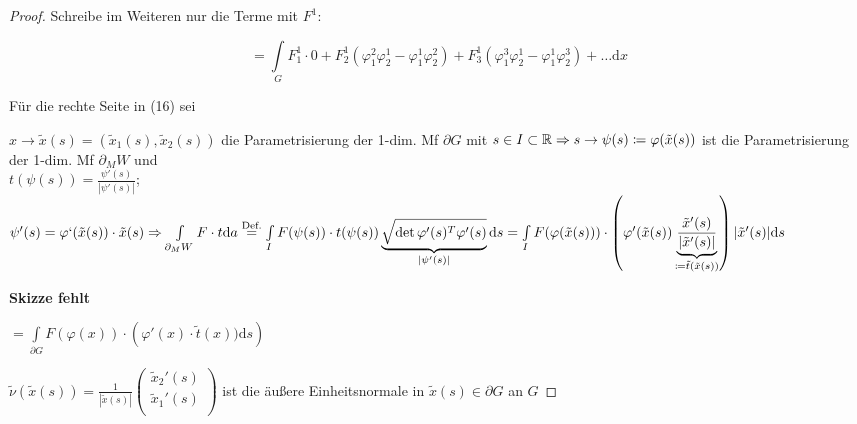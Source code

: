 \begin{proof}
Schreibe im Weiteren nur die Terme mit $F^1$:

\begin{equation*}
    =
    \int\limits_G F_1^1 \cdot 0
    +
    F_2^1 (\varphi_1^2 \varphi_2^1 - \varphi_1^1 \varphi_2^2)
    +
    F_3^1 (\varphi_1^3 \varphi_2^1 - \varphi_1^1 \varphi_2^3)
    +
    \ldots \mathrm{d}x
    \tag{$\heartsuit$}
\end{equation*}

Für die rechte Seite in (16) sei

$x \rightarrow \tilde{x}(s) = (\tilde{x}_1 (s), \tilde{x}_2 (s)) $
die Parametrisierung der 1-dim. Mf $\partial G $ mit
$s \in I \subset \mathbb{R} \\
\Rightarrow s \rightarrow \psi(s) \coloneqq \varphi(\tilde{x}(s)) $
ist die Parametrisierung der 1-dim. Mf $\partial_M W $
und \\
$t(\psi(s)) = \frac{\psi'(s)}{|\psi'(s)|} $;
$\psi'(s) = \varphi`(\tilde{x}(s)) \cdot \tilde{x}(s) \\
\Rightarrow
    \int\limits_{\partial_M W} F \cdot t \mathrm{d}a
\stackrel{\text{Def.}}{=}
    \int\limits_I F(\psi(s)) \cdot t(\psi(s))
    \underbrace{
        \sqrt{\det \varphi'(s)^T \varphi'(s)}
        }_{
        |\psi'(s)|
        }
    \mathrm{d}s \\
=
    \int\limits_I F(\varphi(\tilde{x}(s))) \cdot
    \left(
        \varphi'(\tilde{x}(s)) 
        \underbrace{
            \frac{
                \tilde{x}'(s)
                }{
                |\tilde{x}'(s)|
                }
            }_{
            \coloneqq \tilde{t}(\tilde{x}(s))
            }
    \right)
    |\tilde{x}'(s)| \mathrm{d}s
$

\textbf{Skizze fehlt}    

$
=
    \int\limits_{\partial G} F (\varphi(x)) \cdot
    \left(
        \varphi'(x) \cdot \tilde{t}(x)) \mathrm{d}s
    \right)
$

\hspace{30pt}
    $
    \tilde{\nu}(\tilde{x}(s))
    =
    \frac{1}{
    | \tilde{x}(s) |}
    \begin{pmatrix}
        \tilde{x}_2'(s) \\
        \tilde{x}_1'(s) \\
    \end{pmatrix}
    $
    ist die äußere Einheitsnormale in $\tilde{x}(s) \in \partial G $ an $G$


\end{proof}

